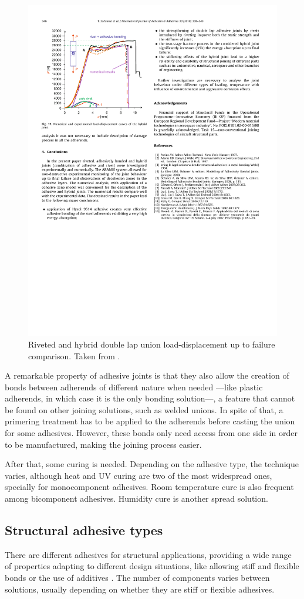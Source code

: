 \documentclass[
documentsize = a4, %
font = cmr, %
typesize = 11, %
printmode = true,
onehalfspacing = true,
language = en, %
titlepage = udciccp, %
degree = pt, %
dedication = true,
acknowledgements = true,
abstract-en = true,
abstract-es = false,
abstract-ga = false,
epigraphs = true,
toc = true,
lof = true,
lot = true,
frontmatterintoc = false,
notation = false,
minimal = false,
]{UDCthesis}
\begin{document}
\begin{figure}
	\centering
	\includegraphics[width=0.65\linewidth]{IMG_CUTRES/sadowski2010_rivet_ads_improvement}
	\caption[Riveted and hybrid double lap union load-displacement up to failure comparison.]{Riveted and hybrid double lap union load-displacement up to failure comparison. Taken from \citet{Sadowski2010}.}
	\label{fig:sadowski2010_rivet_ads_improvement}
\end{figure}

A remarkable property of adhesive joints is that they also allow the creation of bonds between adherends of different nature when needed \citep{Wu2013} ---like plastic adherends, in which case it is the only bonding solution---, a feature that cannot be found on other joining solutions, such as welded unions. In spite of that, a primering treatment has to be applied to the adherends before casting the union for some adhesives. However, these bonds only need access from one side in order to be manufactured, making the joining process easier.

After that, some curing is needed. Depending on the adhesive type, the technique varies, although heat and UV curing are two of the most widespread ones, specially for monocomponent adhesives. Room temperature cure is also frequent among bicomponent adhesives. Humidity cure is another spread solution.

\subsection{Structural adhesive types}
There are different adhesives for structural applications, providing a wide range of properties adapting to different design situations, like allowing stiff and flexible bonds \citep{Loureiro2010} or the use of additives \citep{Vaidya2006}. The number of components varies between solutions, usually depending on whether they are stiff or flexible adhesives.
\end{document}
